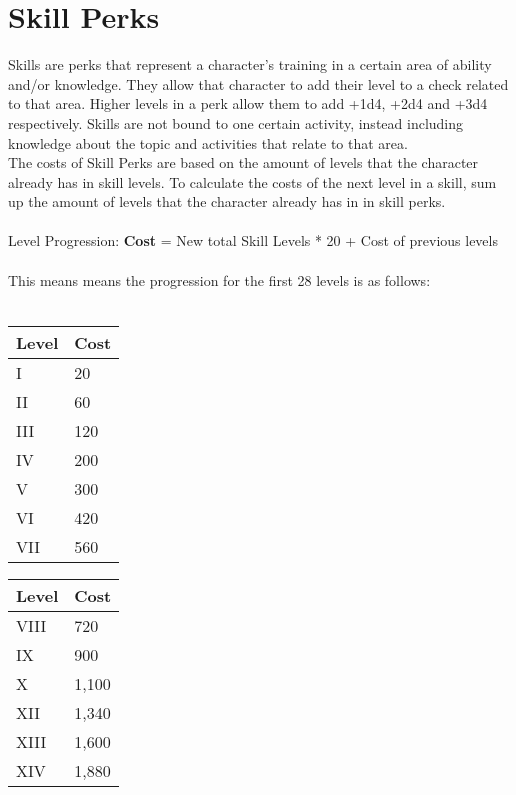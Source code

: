 \chapter{Skill Perks}\label{ch:skillPerks}
Skills are perks that represent a character's training in a certain area of ability and/or knowledge. They allow that character to add their level to a check related to that area. Higher levels in a perk allow them to add +1d4, +2d4 and +3d4 respectively. Skills are not bound to one certain activity, instead including knowledge about the topic and activities that relate to that area.\\
The costs of Skill Perks are based on the amount of levels that the character already has in skill levels. To calculate the costs of the next level in a skill, sum up the amount of levels that the character already has in in skill perks.\\
\\
Level Progression: \textbf{Cost} = New total Skill Levels * 20 + Cost of previous levels\\
\\
This means means the progression for the first 28 levels is as follows:\\
\\
\begin{minipage}{0.25\textwidth}
    \begin{tabular}{l | l}
        Level & Cost\\ \hline
        I & 20\\
        II & 60\\
        III & 120\\
        IV & 200\\
        V & 300\\
        VI & 420\\
        VII & 560\\
    \end{tabular}
\end{minipage}
\begin{minipage}{0.25\textwidth}
    \begin{tabular}{l | l}
        Level & Cost\\ \hline
        VIII & 720\\
        IX & 900\\
        X & 1,100\\
        XII & 1,340\\
        XIII & 1,600\\
        XIV & 1,880\\
    \end{tabular}
\end{minipage}
